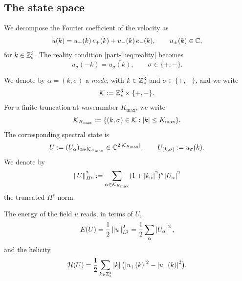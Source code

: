 \subsection{The state space}
\label{part-1:ssec:state}

We decompose the Fourier coefficient of the velocity as
\begin{equation}\label{part-1:eq:decomposition}
\hat u(k) = u_+(k)\,e_+(k) + u_-(k)\,e_-(k),
\qquad u_\pm(k)\in\mathbb{C},
\end{equation}
for $k\in\mathbb{Z}^3_\ast$. The reality condition \eqref{part-1:eq:reality} becomes
\begin{equation}\label{part-1:eq:reality-helical}
u_\sigma(-k) = \overline{u_\sigma(k)},
\qquad \sigma\in\{+,-\}.
\end{equation}

\begin{notation}\label{part-1:not:compound}
We denote by $\alpha = (k,\sigma)$ a \emph{mode}, with 
$k\in\mathbb{Z}^3_\ast$ and $\sigma\in\{+,-\}$, and we write
\begin{equation}\label{part-1:eq:mode-set}
\mathcal{K} := \mathbb{Z}^3_\ast \times \{+,-\}.
\end{equation}
For a finite truncation at wavenumber $K_{\max}$, we write
\begin{equation}\label{part-1:eq:truncated-set}
\mathcal{K}_{K_{\max}} := \{(k,\sigma)\in\mathcal{K} : \left\lvert k \right\rvert\leq K_{\max}\}.
\end{equation}
The corresponding spectral state is
\begin{equation}\label{part-1:eq:state}
U := (U_\alpha)_{\alpha\in\mathcal{K}_{K_{\max}}} \in \mathbb{C}^{2\left\lvert \mathcal{K}_{K_{\max}} \right\rvert},
\qquad
U_{(k,\sigma)} := u_\sigma(k).
\end{equation}
We denote by
\begin{equation}\label{part-1:eq:H-s-norm-state}
\left\lVert U \right\rVert_{H^s}^2 := \sum_{\alpha\in\mathcal{K}_{K_{\max}}}
(1 + \left\lvert k_\alpha \right\rvert^2)^s \left\lvert U_\alpha \right\rvert^2
\end{equation}
the truncated $H^s$ norm.
\end{notation}

The energy of the field $u$ reads, in terms of $U$,
\begin{equation}\label{part-1:eq:energy-state}
E(U) = \frac{1}{2}\left\lVert u \right\rVert_{L^2}^2 = \frac{1}{2}\sum_{\alpha} \left\lvert U_\alpha \right\rvert^2,
\end{equation}
and the helicity
\begin{equation}\label{part-1:eq:helicity-state}
\mathcal{H}(U) = \frac{1}{2}\sum_{k\in\mathbb{Z}^3_\ast} \left\lvert k \right\rvert
\bigl(\left\lvert u_+(k) \right\rvert^2 - \left\lvert u_-(k) \right\rvert^2\bigr).
\end{equation}

